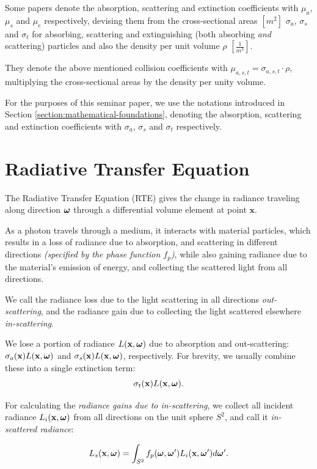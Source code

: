 Some papers denote the absorption, scattering and extinction coefficients
with $\mu_a$, $\mu_s$ and $\mu_e$ respectively, devising them
from the cross-sectional areas $[m^2]$ $\sigma_a$, $\sigma_s$ and $\sigma_t$
for absorbing, scattering and extinguishing (both absorbing \textit{and} scattering) 
particles and also the density per unit volume $\rho$ $[\frac{1}{m^3}]$.

They denote the above mentioned collision coefficients with 
$\mu_{a,s,t} = \sigma_{a,s,t}\cdot\rho$, multiplying the cross-sectional areas by 
the density per unity volume.

For the purposes of this seminar paper, we use the notations
introduced in Section \ref{section:mathematical-foundations}, denoting the absorption, scattering and extinction 
coefficients with $\sigma_{a}$, $\sigma_{s}$ and $\sigma_{t}$ respectively.

\section{Radiative Transfer Equation}\label{appendix:RTE}
The Radiative Transfer Equation (RTE) gives the change in radiance traveling along direction
$\boldsymbol{\omega}$ through a differential volume element at point $\textbf{x}$.

As a photon travels through a medium, it interacts with material particles, which
results in a loss of radiance due to absorption, and scattering in different directions 
\textit{(specified by the phase function $f_p$)}, while also gaining radiance due to the 
material's emission of energy, and collecting the scattered light from all directions.

We call the radiance loss due to the light scattering in all directions \textit{out-scattering}, and the radiance gain due to collecting the light scattered elsewhere \textit{in-scattering}.

We lose a portion of radiance $L(\textbf{x}, \boldsymbol{\omega})$ due to absorption and out-scattering: $\sigma_a(\textbf{x})L(\textbf{x},\boldsymbol{\omega})$ and $\sigma_s(\textbf{x})L(\textbf{x},\boldsymbol{\omega})$, respectively. For brevity, we usually combine these into a single extinction term: $$\sigma_t(\textbf{x})L(\textbf{x}, \boldsymbol{\omega}).$$

For calculating the \textit{radiance gains due to in-scattering}, we collect all incident radiance $L_i(\textbf{x}, \boldsymbol{\omega})$ from all directions on the unit sphere $S^2$, and call it \textit{in-scattered radiance}:

$$L_s(\textbf{x}, \boldsymbol{\omega}) = \int_{S^2} f_p(\boldsymbol{\omega}, \boldsymbol{\omega}') L_i(\textbf{x}, \boldsymbol{\omega}') d\boldsymbol{\omega}'.$$ 

